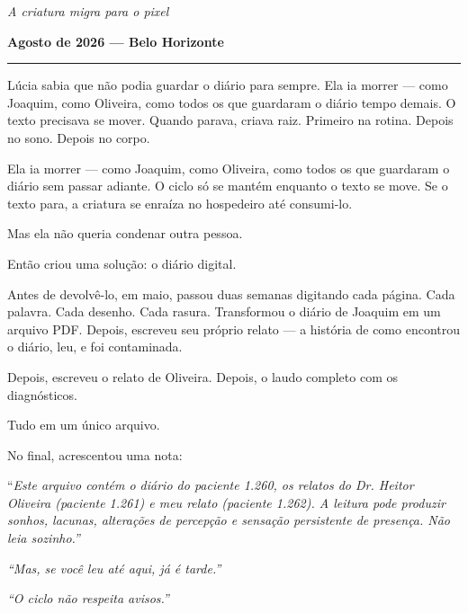 
\noindent \textit{A criatura migra para o pixel}

\noindent \textbf{Agosto de 2026 --- Belo Horizonte}

\vspace{0.5em}\noindent\rule{\textwidth}{0.5pt}\vspace{0.5em}

\noindent Lúcia sabia que não podia guardar o diário para sempre.
\noindent Ela ia morrer --- como Joaquim, como Oliveira, como todos os que guardaram o diário tempo demais. O texto precisava se mover. Quando parava, criava raiz. Primeiro na rotina. Depois no sono. Depois no corpo.

\noindent Ela ia morrer --- como Joaquim, como Oliveira, como todos os que guardaram o diário sem passar adiante. O ciclo só se mantém enquanto o texto se move. Se o texto para, a criatura se enraíza no hospedeiro até consumi-lo.

\noindent Mas ela não queria condenar outra pessoa.

\noindent Então criou uma solução: o diário digital.

\noindent Antes de devolvê-lo, em maio, passou duas semanas digitando cada página. Cada palavra. Cada desenho. Cada rasura. Transformou o diário de Joaquim em um arquivo PDF. Depois, escreveu seu próprio relato --- a história de como encontrou o diário, leu, e foi contaminada.

\noindent Depois, escreveu o relato de Oliveira. Depois, o laudo completo com os diagnósticos.

\noindent Tudo em um único arquivo.

\noindent No final, acrescentou uma nota:

\noindent \textquotedblleft{\textit{Este arquivo contém o diário do paciente 1.260, os relatos do Dr. Heitor Oliveira (paciente 1.261) e meu relato (paciente 1.262). A leitura pode produzir sonhos, lacunas, alterações de percepção e sensação persistente de presença. Não leia sozinho.\textquotedblright{}}}

\noindent \textit{\textquotedblleft{}Mas, se você leu até aqui, já é tarde.\textquotedblright{}}

\noindent \textit{\textquotedblleft{}O ciclo não respeita avisos.\textquotedblright{}}

